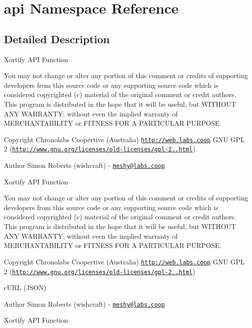 \hypertarget{namespaceapi}{\section{api Namespace Reference}
\label{namespaceapi}
}


\subsection{Detailed Description}
Xortify A\-P\-I Function

You may not change or alter any portion of this comment or credits of supporting developers from this source code or any supporting source code which is considered copyrighted (c) material of the original comment or credit authors. This program is distributed in the hope that it will be useful, but W\-I\-T\-H\-O\-U\-T A\-N\-Y W\-A\-R\-R\-A\-N\-T\-Y; without even the implied warranty of M\-E\-R\-C\-H\-A\-N\-T\-A\-B\-I\-L\-I\-T\-Y or F\-I\-T\-N\-E\-S\-S F\-O\-R A P\-A\-R\-T\-I\-C\-U\-L\-A\-R P\-U\-R\-P\-O\-S\-E.

\begin{DoxyCopyright}{Copyright}
Chronolabs Coopertive (Australia) \href{http://web.labs.coop}{\tt http\-://web.\-labs.\-coop}  G\-N\-U G\-P\-L 2 (\href{http://www.gnu.org/licenses/old-licenses/gpl-2.0.html}{\tt http\-://www.\-gnu.\-org/licenses/old-\/licenses/gpl-\/2..\-html})
\end{DoxyCopyright}
\begin{DoxyAuthor}{Author}
Simon Roberts (wishcraft) -\/ \href{mailto:meshy@labs.coop}{\tt meshy@labs.\-coop}
\end{DoxyAuthor}
Xortify A\-P\-I Function

You may not change or alter any portion of this comment or credits of supporting developers from this source code or any supporting source code which is considered copyrighted (c) material of the original comment or credit authors. This program is distributed in the hope that it will be useful, but W\-I\-T\-H\-O\-U\-T A\-N\-Y W\-A\-R\-R\-A\-N\-T\-Y; without even the implied warranty of M\-E\-R\-C\-H\-A\-N\-T\-A\-B\-I\-L\-I\-T\-Y or F\-I\-T\-N\-E\-S\-S F\-O\-R A P\-A\-R\-T\-I\-C\-U\-L\-A\-R P\-U\-R\-P\-O\-S\-E.

\begin{DoxyCopyright}{Copyright}
Chronolabs Coopertive (Australia) \href{http://web.labs.coop}{\tt http\-://web.\-labs.\-coop}  G\-N\-U G\-P\-L 2 (\href{http://www.gnu.org/licenses/old-licenses/gpl-2.0.html}{\tt http\-://www.\-gnu.\-org/licenses/old-\/licenses/gpl-\/2..\-html})
\end{DoxyCopyright}
c\-U\-R\-L (J\-S\-O\-N) \begin{DoxyAuthor}{Author}
Simon Roberts (wishcraft) -\/ \href{mailto:meshy@labs.coop}{\tt meshy@labs.\-coop}
\end{DoxyAuthor}
Xortify A\-P\-I Function

